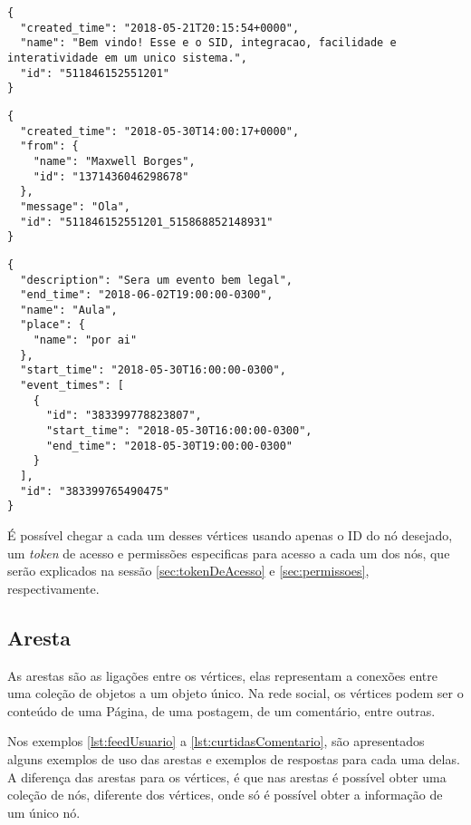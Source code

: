 \begin{lstlisting}[caption={Resposta do servidor a uma requisição \ref{lst:postagem} (Postagem)},label={lst:retornoPostagem}]
{
  "created_time": "2018-05-21T20:15:54+0000",
  "name": "Bem vindo! Esse e o SID, integracao, facilidade e interatividade em um unico sistema.",
  "id": "511846152551201"
}
\end{lstlisting}

\begin{lstlisting}[caption={Resposta do servidor a uma requisição \ref{lst:comentario} (Comentário)},label={lst:retornoComentario}]
{
  "created_time": "2018-05-30T14:00:17+0000",
  "from": {
    "name": "Maxwell Borges",
    "id": "1371436046298678"
  },
  "message": "Ola",
  "id": "511846152551201_515868852148931"
}
\end{lstlisting}

\begin{lstlisting}[caption={Resposta do servidor a uma requisição \ref{lst:evento} (Evento)},label={lst:retornoEvento}]
{
  "description": "Sera um evento bem legal",
  "end_time": "2018-06-02T19:00:00-0300",
  "name": "Aula",
  "place": {
    "name": "por ai"
  },
  "start_time": "2018-05-30T16:00:00-0300",
  "event_times": [
    {
      "id": "383399778823807",
      "start_time": "2018-05-30T16:00:00-0300",
      "end_time": "2018-05-30T19:00:00-0300"
    }
  ],
  "id": "383399765490475"
}
\end{lstlisting}

É possível chegar a cada um desses vértices usando apenas o ID do nó desejado, um \textit{token} de acesso e permissões especificas para acesso a cada um dos nós, que serão explicados na sessão \ref{sec:tokenDeAcesso} e \ref{sec:permissoes}, respectivamente.

\subsection{Aresta}
As arestas são as ligações entre os vértices, elas representam a conexões entre uma coleção de objetos a um objeto único. Na rede social, os vértices podem ser o conteúdo de uma Página, de uma postagem, de um comentário, entre outras.

Nos exemplos \ref{lst:feedUsuario} a \ref{lst:curtidasComentario}, são apresentados alguns exemplos de uso das arestas e exemplos de respostas para cada uma delas. A diferença das arestas para os vértices, é que nas arestas é possível obter uma coleção de nós, diferente dos vértices, onde só é possível obter a informação de um único nó.

